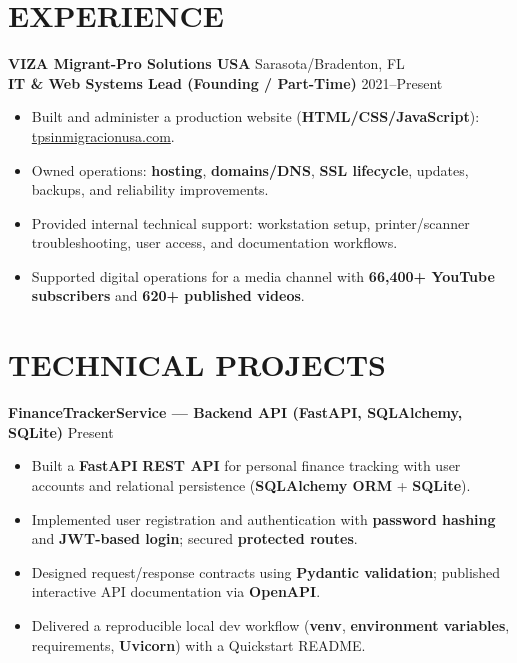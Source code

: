 \documentclass[10pt]{article}
\begin{document}
\section{EXPERIENCE}

\textbf{VIZA Migrant-Pro Solutions USA} \hfill Sarasota/Bradenton, FL\\
\textbf{IT \& Web Systems Lead (Founding / Part-Time)} \hfill 2021--Present
\begin{itemize}
  \small
  \item Built and administer a production website (\textbf{HTML/CSS/JavaScript}): \href{https://tpsinmigracionusa.com}{tpsinmigracionusa.com}.
  \item Owned operations: \textbf{hosting}, \textbf{domains/DNS}, \textbf{SSL lifecycle}, updates, backups, and reliability improvements.
  \item Provided internal technical support: workstation setup, printer/scanner troubleshooting, user access, and documentation workflows.
  \item Supported digital operations for a media channel with \textbf{66,400+ YouTube subscribers} and \textbf{620+ published videos}.
\end{itemize}
\normalsize

\section{TECHNICAL PROJECTS}

\textbf{FinanceTrackerService — Backend API (\textbf{FastAPI}, \textbf{SQLAlchemy}, \textbf{SQLite})} \hfill Present
\begin{itemize}
  \small
  \item Built a \textbf{FastAPI} \textbf{REST API} for personal finance tracking with user accounts and relational persistence (\textbf{SQLAlchemy ORM} + \textbf{SQLite}).
  \item Implemented user registration and authentication with \textbf{password hashing} and \textbf{JWT-based login}; secured \textbf{protected routes}.
  \item Designed request/response contracts using \textbf{Pydantic validation}; published interactive API documentation via \textbf{OpenAPI}.
  \item Delivered a reproducible local dev workflow (\textbf{venv}, \textbf{environment variables}, requirements, \textbf{Uvicorn}) with a Quickstart README.
\end{itemize}
\normalsize
\end{document}
